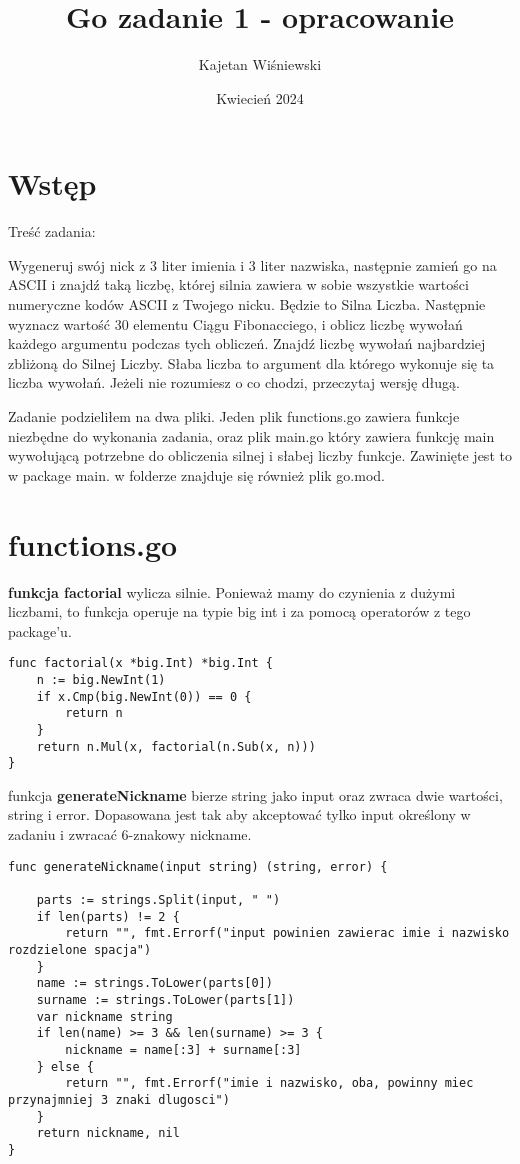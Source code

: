 \documentclass{article}
\title{Go zadanie 1 - opracowanie}
\author{Kajetan Wiśniewski}
\date{Kwiecień 2024}
\begin{document}
\maketitle

\section{Wstęp}

Treść zadania:


Wygeneruj swój nick z 3 liter imienia i 3 liter nazwiska, następnie zamień go na ASCII i znajdź taką liczbę, której silnia zawiera w sobie wszystkie wartości numeryczne kodów ASCII z Twojego nicku. Będzie to Silna Liczba. Następnie wyznacz wartość 30 elementu Ciągu Fibonacciego, i oblicz liczbę wywołań każdego argumentu podczas tych obliczeń. Znajdź liczbę wywołań najbardziej zbliżoną do Silnej Liczby. Słaba liczba to argument dla którego wykonuje się ta liczba wywołań. Jeżeli nie rozumiesz o co chodzi, przeczytaj wersję długą.

Zadanie podzieliłem na dwa pliki. Jeden plik functions.go zawiera funkcje niezbędne do wykonania zadania, oraz plik main.go który zawiera funkcję main wywołującą potrzebne do obliczenia silnej i słabej liczby funkcje. Zawinięte jest to w package main. w folderze znajduje się również plik go.mod.

\section{functions.go}

\textbf{funkcja factorial} wylicza silnie. Ponieważ mamy do czynienia z dużymi liczbami, to funkcja operuje na typie big int i za pomocą operatorów z tego package'u.
\begin{lstlisting}
func factorial(x *big.Int) *big.Int {
	n := big.NewInt(1)
	if x.Cmp(big.NewInt(0)) == 0 {
		return n
	}
	return n.Mul(x, factorial(n.Sub(x, n)))
}
\end{lstlisting}

funkcja \textbf{generateNickname} bierze string jako input oraz zwraca dwie wartości, string i error. Dopasowana jest tak aby akceptować tylko input określony w zadaniu i zwracać 6-znakowy nickname.

\newpage
\begin{lstlisting}
func generateNickname(input string) (string, error) {

    parts := strings.Split(input, " ")
    if len(parts) != 2 {
        return "", fmt.Errorf("input powinien zawierac imie i nazwisko rozdzielone spacja")
    }
    name := strings.ToLower(parts[0])
    surname := strings.ToLower(parts[1])
    var nickname string
    if len(name) >= 3 && len(surname) >= 3 {
        nickname = name[:3] + surname[:3]
    } else {
        return "", fmt.Errorf("imie i nazwisko, oba, powinny miec przynajmniej 3 znaki dlugosci")
    }
    return nickname, nil
}
\end{lstlisting}
\end{document}
